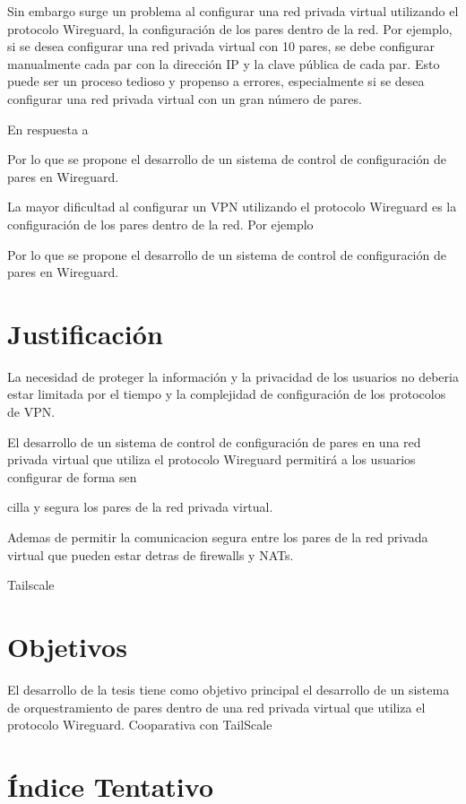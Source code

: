 \documentclass{article}
\begin{document}
Sin embargo surge un problema al configurar una red privada virtual utilizando el protocolo Wireguard, la configuración de los pares dentro de la red. Por ejemplo, si se desea configurar una red privada virtual con 10 pares, se debe configurar manualmente cada par con la dirección IP y la clave pública de cada par. Esto puede ser un proceso tedioso y propenso a errores, especialmente si se desea configurar una red privada virtual con un gran número de pares.

En respuesta a 

Por lo que se propone el desarrollo de un sistema de control de configuración de pares en Wireguard.

La mayor dificultad al configurar un VPN utilizando el protocolo Wireguard es la configuración de los pares dentro de la red. Por ejemplo 

Por lo que se propone el desarrollo de un sistema de control de configuración de pares en Wireguard.

\section{Justificación}
    
La necesidad de proteger la información y la privacidad de los usuarios no deberia estar limitada por el tiempo y la complejidad de configuración de los protocolos de VPN. 



El desarrollo de un sistema de control de configuración de pares en una red privada virtual que utiliza el protocolo Wireguard permitirá a los usuarios configurar de forma sen


cilla y segura los pares de la red privada virtual.

Ademas de permitir la comunicacion segura entre los pares de la red privada virtual que pueden estar detras de firewalls y NATs.

Tailscale

\section{Objetivos}

El desarrollo de la tesis tiene como objetivo principal el desarrollo de un sistema de orquestramiento de pares dentro de una red privada virtual que utiliza el protocolo Wireguard.
Cooparativa con TailScale

\section{Índice Tentativo}
\end{document}
